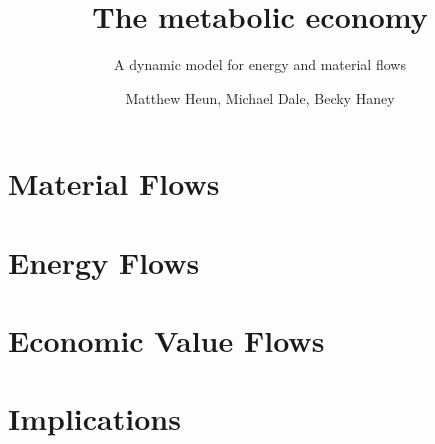 \documentclass[graybox,envcountchap,sectrefs]{svmono}
\begin{document}
\author{Matthew Heun, Michael Dale,  Becky Haney}
\title{The metabolic economy}
\subtitle{A dynamic model for energy and material flows}
\maketitle

\frontmatter%

%
%
%
%

\tableofcontents

%


\mainmatter%



\part{Material Flows}



\part{Energy Flows}





\part{Economic Value Flows}

 

 

\part{Implications}










%

\backmatter%
%
%

\end{document}

